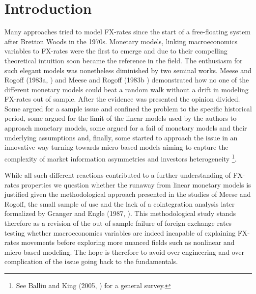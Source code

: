 \section{Introduction}

%
%
Many approaches tried to model FX-rates since the start of a free-floating system after Bretton Woods in the 1970s. Monetary models, linking macroeconomics variables to FX-rates were the first to emerge and due to their compelling theoretical intuition soon became the reference in the field. The enthusiasm for such elegant models was nonetheless diminished by two seminal works. Meese and Rogoff (1983a, \cite{MeeseRogoffa}) and Meese and Rogoff (1983b \cite{MeeseRogoffb}) demonstrated how no one of the different monetary models could beat a random walk without a drift in modeling FX-rates out of sample. After the evidence was presented the opinion divided. Some argued for a sample issue and confined the problem to the specific historical period, some argued for the limit of the linear models used by the authors to approach monetary models, some argued for a fail of monetary models and their underlying assumptions and, finally, some started to approach the issue in an innovative way turning towards micro-based models aiming to capture the complexity of market information asymmetries and investors heterogeneity \footnote{See Balliu and King (2005, \cite{BalliuKing}) for a general survey.}.

While all such different reactions contributed to a further understanding of FX-rates properties we question whether the runaway from linear monetary models is justified given the methodological approach presented in the studies of Meese and Rogoff, the small sample of use and the lack of a cointegration analysis later formalized by Granger and Engle (1987,  \cite{EngleGranger}). 
% 
%
This methodological study stands therefore as a revision of the out of sample failure of foreign exchange rates testing whether macroeconomics variables are indeed incapable of explaining FX-rates movements before exploring more nuanced fields such as nonlinear and micro-based modeling. The hope is therefore to avoid over engineering and over complication of the issue going back to the fundamentals.

